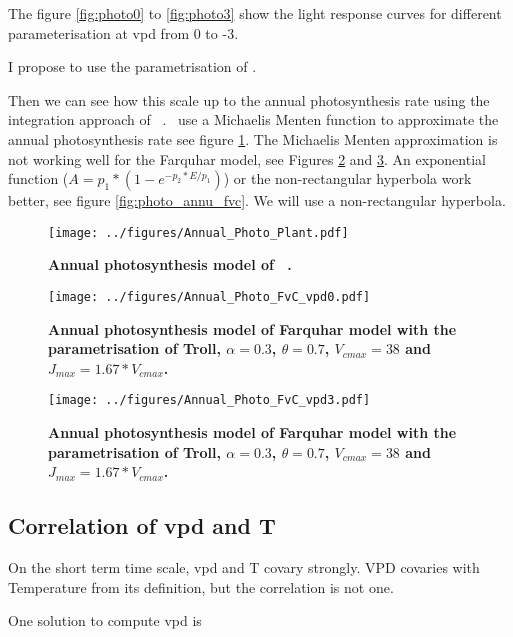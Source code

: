 \documentclass[a4paper,11pt]{article}
\begin{document}
The figure \ref{fig:photo0} to \ref{fig:photo3} show the light response curves for
different parameterisation at vpd from 0 to -3.

I propose to use the parametrisation of \citet{Marechaux-2017}.

\clearpage

Then we can see how this scale up to the annual photosynthesis rate
using the integration approach of \plant\ . \plant\ use a Michaelis
Menten function to approximate the annual photosynthesis rate see
figure \ref{fig:photo_annu_plant}. The Michaelis Menten approximation
is not working well for the Farquhar model, see Figures
\ref{fig:photo_annu_fvc0} and \ref{fig:photo_annu_fvc3}. An exponential function \citep{Chen-2016} ($A = p_1 *(1-e^{-p_2* E/p_1})$) or the non-rectangular hyperbola work better, see figure \ref{fig:photo_annu_fvc}. We will use a non-rectangular hyperbola.


\begin{figure}[ht]
\centering
\texttt{[image: ../figures/Annual\_Photo\_Plant.pdf]}
\caption{\textbf{Annual photosynthesis model of \plant\ .}
\label{fig:photo_annu_plant}}
\end{figure}


\begin{figure}[ht]
\centering
\texttt{[image: ../figures/Annual\_Photo\_FvC\_vpd0.pdf]}
\caption{\textbf{Annual photosynthesis model of Farquhar model with the parametrisation of Troll, $\alpha = 0.3$, $\theta = 0.7$, $V_{cmax} = 38$ and $J_{max} = 1.67 * V_{cmax}$.}
\label{fig:photo_annu_fvc0}}
\end{figure}


\begin{figure}[ht]
\centering
\texttt{[image: ../figures/Annual\_Photo\_FvC\_vpd3.pdf]}
\caption{\textbf{Annual photosynthesis model of Farquhar model with the parametrisation of Troll, $\alpha = 0.3$, $\theta = 0.7$, $V_{cmax} = 38$ and $J_{max} = 1.67 * V_{cmax}$.}
\label{fig:photo_annu_fvc3}}
\end{figure}


\clearpage

\subsection{Correlation of vpd and T}

On the short term time scale, vpd and T covary strongly. VPD covaries with Temperature from its definition, but the correlation is not one.

One solution to compute vpd is
\end{document}
